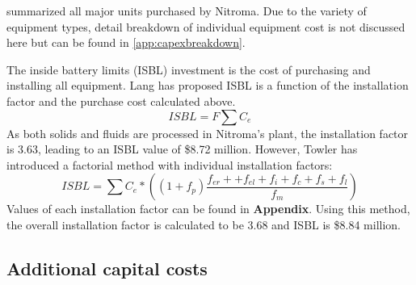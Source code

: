  summarized all major units purchased by Nitroma. Due to the variety of equipment types, detail breakdown of individual equipment cost is not discussed here but can be found in \cref{app:capexbreakdown}.

The inside battery limits (ISBL) investment is the cost of purchasing and installing all equipment. Lang has proposed ISBL is a function of the installation factor and the purchase cost calculated above.
\begin{equation}
    ISBL=F\sum C_{e}    
\end{equation}
As both solids and fluids are processed in Nitroma's plant, the installation factor is 3.63, leading to an ISBL value of \$8.72 million. However, Towler \cite{sinnott_chemical_2020} has introduced a factorial method with individual installation factors:
\begin{equation}
    ISBL=\sum C_{e}*\left(\left(1+f_{p}\right)\frac{f_{er}++f_{el}+f_{i}+f_{c}+f_{s}+f_{l}}{f_{m}}\right)
\end{equation}
Values of each installation factor can be found in \textbf{Appendix}. Using this method, the overall installation factor is calculated to be 3.68 and ISBL is \$8.84 million.

\subsection{Additional capital costs}

